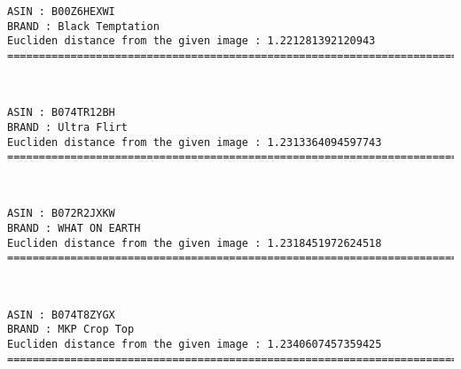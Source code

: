 \documentclass[11pt]{article}
\begin{document}
    \begin{Verbatim}[commandchars=\\\{\}]
ASIN : B00Z6HEXWI
BRAND : Black Temptation
Eucliden distance from the given image : 1.221281392120943
=============================================================================================================================

    \end{Verbatim}

    \begin{center}
    \end{center}
    { \hspace*{\fill} \\}
    
    \begin{Verbatim}[commandchars=\\\{\}]
ASIN : B074TR12BH
BRAND : Ultra Flirt
Eucliden distance from the given image : 1.2313364094597743
=============================================================================================================================

    \end{Verbatim}

    \begin{center}
    \end{center}
    { \hspace*{\fill} \\}
    
    \begin{Verbatim}[commandchars=\\\{\}]
ASIN : B072R2JXKW
BRAND : WHAT ON EARTH
Eucliden distance from the given image : 1.2318451972624518
=============================================================================================================================

    \end{Verbatim}

    \begin{center}
    \end{center}
    { \hspace*{\fill} \\}
    
    \begin{Verbatim}[commandchars=\\\{\}]
ASIN : B074T8ZYGX
BRAND : MKP Crop Top
Eucliden distance from the given image : 1.2340607457359425
=============================================================================================================================

    \end{Verbatim}
\end{document}
